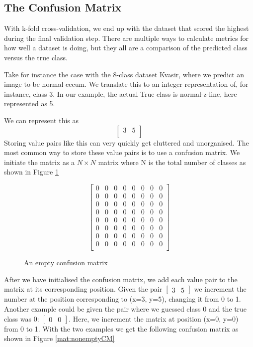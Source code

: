 \subsection{The Confusion Matrix}
With k-fold cross-validation, we end up with the dataset that scored the highest during the final validation step.  There are multiple ways to calculate metrics for how well a dataset is doing,  but they all are a comparison of the predicted class versus the true class.  

Take for instance the case with the 8-class dataset Kvasir, where we predict an image to be normal-cecum. We translate this to an integer representation of, for instance, class 3. In our example, the actual True class is normal-z-line, here represented as 5. 

We can represent this as 
\[
\begin{bmatrix}
 3 & 5\\ 
\end{bmatrix}
\]
Storing value pairs like this can very quickly get cluttered and unorganised.
The most common way to store these value pairs is to use a confusion matrix.  We initiate the matrix as a \textit{$N \times N$} matrix where N is the total number of classes as shown in Figure \ref{mat:emptyCM}

\begin{figure}[h]
    \myfontsize
    \centering
    \[
    \begin{bmatrix}
     0 & 0 &  0 &  0 &  0 &  0 &  0 &  0\\
     0 & 0 &  0 &  0 &  0 &  0 &  0 &  0\\
     0 & 0 &  0 &  0 &  0 &  0 &  0 &  0\\
     0 & 0 &  0 &  0 &  0 &  0 &  0 &  0\\
     0 & 0 &  0 &  0 &  0 &  0 &  0 &  0\\
     0 & 0 &  0 &  0 &  0 &  0 &  0 &  0\\
     0 & 0 &  0 &  0 &  0 &  0 &  0 &  0\\
     0 & 0 &  0 &  0 &  0 &  0 &  0 &  0\\
    \end{bmatrix}
    \]
    \caption{An empty confusion matrix}
    \label{mat:emptyCM}
\end{figure}



After we have initialised the confusion matrix, we add each value pair to the matrix at its corresponding position.  
Given the pair $\begin{bmatrix} 3 & 5 \end{bmatrix}$ we increment the number at the position corresponding to (x=3, y=5), changing it from 0 to 1. 
Another example could be given the pair where we guessed class 0 and the true class was 0:  $\begin{bmatrix}  0 & 0 \end{bmatrix}$. Here, we increment the matrix at position (x=0, y=0) from 0 to 1. With the two examples we get the following confusion matrix as shown in Figure \ref{mat:nonemptyCM}

